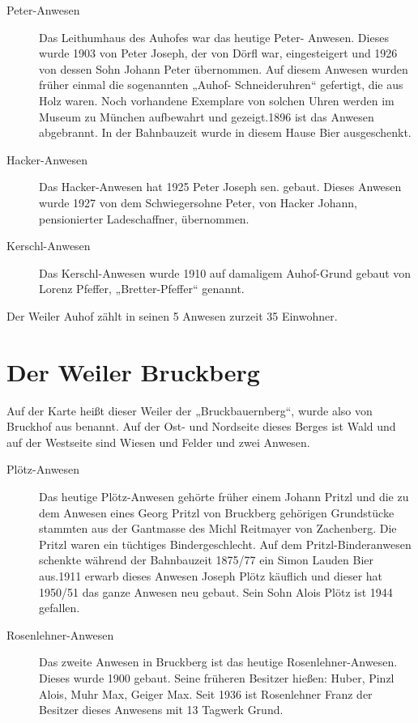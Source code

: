 \documentclass{book}
\begin{document}
\begin{description}
\item[Peter-Anwesen] Das Leithumhaus des Auhofes war das heutige Peter-
Anwesen. Dieses wurde 1903 von Peter Joseph, der von Dörfl war,
eingesteigert und 1926 von dessen Sohn Johann Peter übernommen. Auf
diesem Anwesen wurden früher einmal die sogenannten „Auhof-
Schneideruhren“ gefertigt, die aus Holz waren. Noch vorhandene Exemplare
von solchen Uhren werden im Museum zu München aufbewahrt und
gezeigt.1896 ist das Anwesen abgebrannt. In der Bahnbauzeit wurde in
diesem Hause Bier ausgeschenkt.

\item[Hacker-Anwesen] Das Hacker-Anwesen hat 1925 Peter Joseph sen.
gebaut. Dieses Anwesen wurde 1927 von dem Schwiegersohne Peter, von
Hacker Johann, pensionierter Ladeschaffner, übernommen.

\item[Kerschl-Anwesen] Das Kerschl-Anwesen wurde 1910 auf damaligem
Auhof-Grund gebaut von Lorenz Pfeffer, „Bretter-Pfeffer“ genannt.
\end{description}

Der Weiler Auhof zählt in seinen 5 Anwesen zurzeit 35 Einwohner.

\section{Der Weiler Bruckberg}

Auf der Karte heißt dieser Weiler der „Bruckbauernberg“, wurde also von
Bruckhof aus benannt. Auf der Ost- und Nordseite dieses Berges ist Wald
und auf der Westseite sind Wiesen und Felder und zwei Anwesen.

\begin{description}
\item[Plötz-Anwesen] Das heutige Plötz-Anwesen gehörte früher einem
Johann Pritzl und die zu dem Anwesen eines Georg Pritzl von Bruckberg
gehörigen Grundstücke stammten aus der Gantmasse des Michl Reitmayer von
Zachenberg. Die Pritzl waren ein tüchtiges Bindergeschlecht. Auf dem
Pritzl-Binderanwesen schenkte während der Bahnbauzeit 1875/77 ein Simon
Lauden Bier aus.1911 erwarb dieses Anwesen Joseph Plötz käuflich und
dieser hat 1950/51 das ganze Anwesen neu gebaut. Sein Sohn Alois Plötz
ist 1944 gefallen.

\item[Rosenlehner-Anwesen] Das zweite Anwesen in Bruckberg ist das
heutige Rosenlehner-Anwesen. Dieses wurde 1900 gebaut. Seine früheren
Besitzer hießen: Huber, Pinzl Alois, Muhr Max, Geiger Max. Seit 1936 ist
Rosenlehner Franz der Besitzer dieses Anwesens mit 13 Tagwerk Grund.
\end{description}
\end{document}
